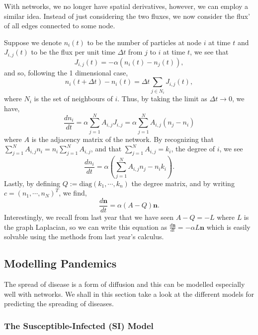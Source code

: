 \documentclass[
]{article}
\theoremstyle{definition}
\theoremstyle{definition}
\begin{document}
With networks, we no longer have spatial derivatives, however, we can
employ a similar idea. Instead of just considering the two fluxes, we
now consider the flux' of all edges connected to some node.

Suppose we denote \(n_i(t)\) to be the number of particles at node \(i\)
at time \(t\) and \(J_{i,j}(t)\) to be the flux per unit time
\(\Delta t\) from \(j\) to \(i\) at time \(t\), we see that
\[J_{i, j}(t) = -\alpha(n_i(t) - n_j(t)),\] and so, following the 1
dimensional case,
\[n_i(t + \Delta t) - n_i(t) = \Delta t \sum_{j \in N_i} J_{i, j}(t),\]
where \(N_i\) is the set of neighbours of \(i\). Thus, by taking the
limit as \(\Delta t \to 0\), we have, \begin{equation}
  \frac{dn_i}{dt} = \alpha \sum_{j = 1}^N A_{i, j} J_{i, j} = 
  \alpha \sum_{j = 1}^N A_{i, j}(n_j - n_i)
\end{equation} where \(A\) is the adjacency matrix of the network. By
recognizing that
\(\sum_{j = 1}^N A_{i, j}n_i = n_i \sum_{j = 1}^N A_{i, j}\), and that
\(\sum_{j = 1}^N A_{i, j} = k_i\), the degree of \(i\), we see
\begin{equation}
  \frac{dn_i}{dt} = \alpha (\sum_{j = 1}^N A_{i, j} n_j - n_i k_i).
\end{equation} Lastly, by defining
\(Q := \text{diag}(k_1, \cdots, k_n)\) the degree matrix, and by writing
\(c = (n_1, \cdots, n_N)^T\), we find, \begin{equation}
  \frac{d\mathbf{n}}{dt} = \alpha (A - Q)\mathbf{n}.
\end{equation} Interestingly, we recall from last year that we have seen
\(A - Q = -L\) where \(L\) is the graph Laplacian, so we can write this
equation as \(\frac{d\mathbf{n}}{dt} = -\alpha L \mathbf{n}\) which is
easily solvable using the methods from last year's calculus.

\hypertarget{modelling-pandemics}{%
\subsection{Modelling Pandemics}\label{modelling-pandemics}}

The spread of disease is a form of diffusion and this can be modelled
especially well with networks. We shall in this section take a look at
the different models for predicting the spreading of diseases.

\hypertarget{the-susceptible-infected-si-model}{%
\subsubsection{The Susceptible-Infected (SI)
Model}\label{the-susceptible-infected-si-model}}
\end{document}
